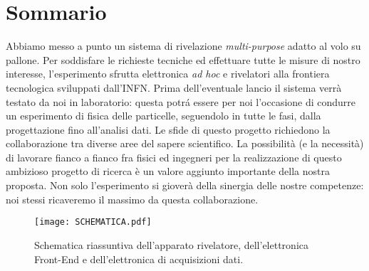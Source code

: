 \section{Sommario}

Abbiamo messo a punto un sistema di rivelazione \emph{multi-purpose} adatto al volo su pallone. Per soddisfare le richieste tecniche ed effettuare tutte le misure di nostro interesse, l'esperimento sfrutta elettronica \emph{ad hoc} e rivelatori alla frontiera tecnologica sviluppati dall'INFN. Prima dell'eventuale lancio il sistema verrà testato da noi in laboratorio: questa potr\'a essere per noi l'occasione di condurre un esperimento di fisica delle particelle, seguendolo in tutte le fasi, dalla progettazione fino all'analisi dati. Le sfide di questo progetto richiedono la collaborazione tra diverse aree del sapere scientifico. La possibilità (e la necessità) di lavorare fianco a fianco fra fisici ed ingegneri per la realizzazione di questo ambizioso progetto di ricerca è un valore aggiunto importante della nostra proposta. Non solo l'esperimento si gioverà della sinergia delle nostre competenze: noi stessi ricaveremo il massimo da questa collaborazione. 

\begin{figure}[h]
\centering
\texttt{[image: SCHEMATICA.pdf]}
\caption{Schematica riassuntiva dell'apparato rivelatore, dell'elettronica Front-End e dell'elettronica di acquisizioni dati.}
\label{schematica}
\end{figure}
